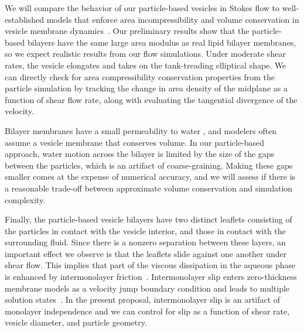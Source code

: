 
We will compare the behavior of our particle-based vesicles in Stokes
flow to well-established models that enforce area incompressibility and
volume conservation in vesicle membrane
dynamics~\cite{torres-sanchez_millan_arroyo_2019,
mahapatra_saintillan_rangamani_2020, Steigmann99, C6SM02452A}. Our
preliminary results show that the particle-based bilayers have the same
large area modulus as real lipid bilayer membranes, so we expect
realistic results from our flow simulations. Under moderate shear rates,
the vesicle elongates and takes on the tank-treading elliptical shape.
We can directly check for area compressibility conservation properties
from the particle simulation by tracking the change in area density of
the midplane as a function of shear flow rate, along with evaluating the
tangential divergence of the velocity.


Bilayer membranes have a small permeability to water
\cite{323e9a2f0c58487ea82518d7a1f96485}, and modelers often assume a
vesicle membrane that conserves volume. In our particle-based approach,
water motion across the bilayer is limited by the size of the gaps
between the particles, which is an artifact of coarse-graining.  Making
these gaps smaller comes at the expense of numerical accuracy, and we
will assess if there is a reasonable trade-off between approximate
volume conservation and simulation complexity. 



Finally, the particle-based vesicle bilayers have two distinct leaflets
consisting of the particles in contact with the vesicle interior, and
those in contact with the surrounding fluid. Since there is a nonzero
separation between these layers, an important effect we observe is that
the leaflets slide against one another under shear flow.  This implies
that part of the viscous dissipation in the aqueous phase is enhanced by
intermonolayer friction~\cite{SHKULIPA2005823, ShkulipaThesis}.
Intermonolayer slip enters zero-thickness membrane models as a velocity
jump boundary condition and leads to multiple solution
states~\cite{schwalbe_vlahovska_miksis_2010}.  In the present proposal,
intermonolayer slip is an artifact of monolayer independence  and we can
control for slip as a function of shear rate, vesicle diameter, and
particle geometry.

